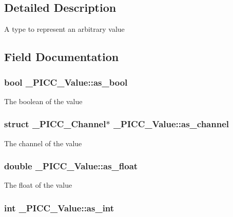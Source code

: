 \subsection{Detailed Description}
A type to represent an arbitrary value 

\subsection{Field Documentation}
\hypertarget{struct__PICC__Value_a325709a2dce45972f933f358f0546327}{
\subsubsection[{as\-\_\-bool}]{\setlength{\rightskip}{0pt plus 5cm}bool \-\_\-\-P\-I\-C\-C\-\_\-\-Value\-::as\-\_\-bool}}\label{struct__PICC__Value_a325709a2dce45972f933f358f0546327}
The boolean of the value \hypertarget{struct__PICC__Value_a5b09e392f74cf7a493e0524c904b0ea2}{
\subsubsection[{as\-\_\-channel}]{\setlength{\rightskip}{0pt plus 5cm}struct {\bf \-\_\-\-P\-I\-C\-C\-\_\-\-Channel}$\ast$ \-\_\-\-P\-I\-C\-C\-\_\-\-Value\-::as\-\_\-channel}}\label{struct__PICC__Value_a5b09e392f74cf7a493e0524c904b0ea2}
The channel of the value \hypertarget{struct__PICC__Value_a9ef852abed242872ec66473b1dbf52ce}{
\subsubsection[{as\-\_\-float}]{\setlength{\rightskip}{0pt plus 5cm}double \-\_\-\-P\-I\-C\-C\-\_\-\-Value\-::as\-\_\-float}}\label{struct__PICC__Value_a9ef852abed242872ec66473b1dbf52ce}
The float of the value \hypertarget{struct__PICC__Value_a9a5694c2d3ca43921fd537cf7f653a82}{
\subsubsection[{as\-\_\-int}]{\setlength{\rightskip}{0pt plus 5cm}int \-\_\-\-P\-I\-C\-C\-\_\-\-Value\-::as\-\_\-int}}\label{struct__PICC__Value_a9a5694c2d3ca43921fd537cf7f653a82}
